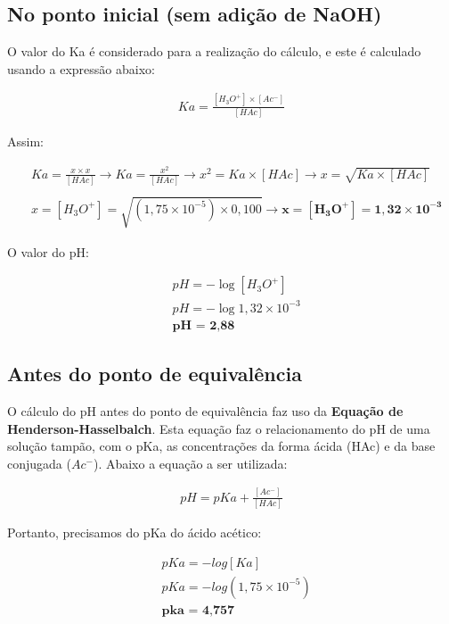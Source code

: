 \documentclass[a4paper, 12pt]{report}
\begin{document}
\subsection{No ponto inicial (sem adição de NaOH)}
O valor do Ka é considerado para a realização do cálculo, e este é calculado usando a expressão abaixo:
\begin{fleqn}
\begin{align*}
	Ka = \frac{[H_{3}O^{+}] \times [Ac^{-}]}{[HAc]}
\end{align*}
\end{fleqn}
Assim:
\begin{fleqn}
\begin{align*}
	& Ka = \frac{x \times x}{[HAc]} \longrightarrow	Ka = \frac{x^{2}}{[HAc]} \rightarrow x^{2} = Ka \times [HAc] \longrightarrow	 x = \sqrt{Ka \times [HAc]} \\ \\
	& x = [H_{3}O^{+}] = \sqrt{(1,75 \times 10^{-5}) \times 0,100} \longrightarrow	\mathbf{x = [H_{3}O^{+}] = 1,32 \times 10^{-3}}
\end{align*}
\end{fleqn}
O valor do pH:
\begin{fleqn}
\begin{align*}
	& pH = - \log [H_{3}O^{+}] \\
	& pH = - \log {1,32 \times 10^{-3}} \\
	& \textbf{pH = 2,88}
\end{align*}
\end{fleqn}

\subsection{Antes do ponto de equivalência}
O cálculo do pH antes do ponto de equivalência faz uso da \textbf{Equação de Henderson-Hasselbalch}. Esta equação faz o relacionamento do pH de uma solução tampão, com o pKa, as concentrações da forma ácida (HAc) e da base conjugada ($Ac^{-}$). Abaixo a equação a ser utilizada:
\begin{fleqn}
\begin{align*}
	pH = pKa + \frac{[Ac^{-}]}{[HAc]}
\end{align*}
\end{fleqn}
Portanto, precisamos do pKa do ácido acético:
\begin{fleqn}
\begin{align*}
	& pKa = -log [Ka] \\
	& pKa = -log (1,75 \times 10^{-5}) \\
	& \textbf{pka = 4,757}
\end{align*}
\end{fleqn}
\end{document}
